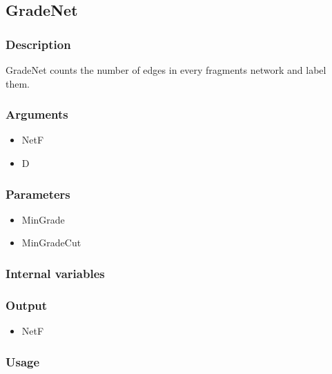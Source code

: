 \subsection{GradeNet}
\subsubsection{Description}
GradeNet counts the number of edges in every fragments network and label them.
\subsubsection{Arguments}
\begin{itemize}
\item NetF
\item D
\end{itemize}
\subsubsection{Parameters}
\begin{itemize}
\item MinGrade
\item MinGradeCut
\end{itemize}
\subsubsection{Internal variables}
\subsubsection{Output}
\begin{itemize}
\item NetF
\end{itemize}
\subsubsection{Usage}

